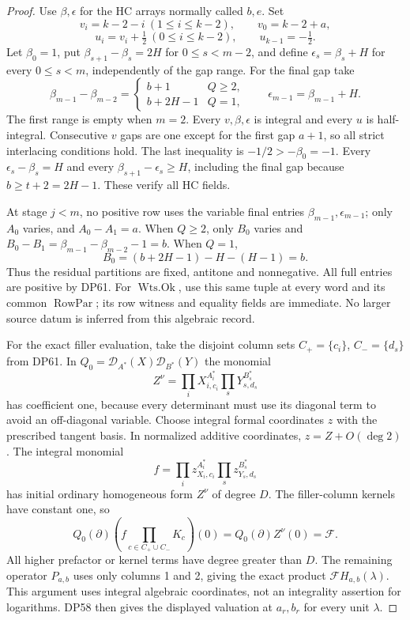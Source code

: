 \begin{proof}
Use $\beta,\epsilon$ for the HC arrays normally called $b,e$.
Set
\[
 v_i=k-2-i\ (1\le i\le k-2),\qquad v_0=k-2+a,
\]
\[
 u_i=v_i+\tfrac12\ (0\le i\le k-2),\qquad u_{k-1}=-\tfrac12.
\]
Let $\beta_0=1$, put $\beta_{s+1}-\beta_s=2H$ for $0\le s<m-2$,
and define $\epsilon_s=\beta_s+H$ for every $0\le s<m$, independently
of the gap range. For the final gap take
\[
 \beta_{m-1}-\beta_{m-2}=
 \begin{cases}b+1&Q\ge2,\\b+2H-1&Q=1,\end{cases}
 \qquad\epsilon_{m-1}=\beta_{m-1}+H.
\]
The first range is empty when $m=2$. Every $v,\beta,\epsilon$ is
integral and every $u$ is half-integral. Consecutive $v$ gaps are one
except for the first gap $a+1$, so all strict interlacing conditions
hold. The last inequality is $-1/2>-\beta_0=-1$.
Every $\epsilon_s-\beta_s=H$ and every
$\beta_{s+1}-\epsilon_s\ge H$, including the final gap because
$b\ge t+2=2H-1$. These verify all HC fields.

At stage $j<m$, no positive row uses the variable final entries
$\beta_{m-1},\epsilon_{m-1}$; only $A_0$ varies, and
$A_0-A_1=a$. When $Q\ge2$, only $B_0$ varies and
$B_0-B_1=\beta_{m-1}-\beta_{m-2}-1=b$.
When $Q=1$,
\[
 B_0=(b+2H-1)-H-(H-1)=b.
\]
Thus the residual partitions are fixed, antitone and nonnegative.
All full entries are positive by DP61. For $\operatorname{Wts.Ok}$,
use this same tuple at every word and its common $\operatorname{RowPar}$;
its row witness and equality fields are immediate. No larger source
datum is inferred from this algebraic record.

For the exact filler evaluation, take the disjoint column sets
$C_+=\{c_i\}$, $C_-=\{d_s\}$ from DP61. In
$Q_0=\mathcal D_{A^*}(X)\mathcal D_{B^*}(Y)$ the monomial
\[
 Z^\nu=\prod_iX_{i,c_i}^{A_i^*}\prod_sY_{s,d_s}^{B_s^*}
\]
has coefficient one, because every determinant must use its diagonal
term to avoid an off-diagonal variable. Choose integral formal
coordinates $z$ with the prescribed tangent basis. In normalized
additive coordinates, $z=Z+O(\deg2)$. The integral monomial
\[
 f=\prod_i z_{X_i,c_i}^{A_i^*}\prod_s z_{Y_s,d_s}^{B_s^*}
\]
has initial ordinary homogeneous form $Z^\nu$ of degree $D$.
The filler-column kernels have constant one, so
\[
 Q_0(\partial)\left(f\prod_{c\in C_+\cup C_-}K_c\right)(0)
 =Q_0(\partial)Z^\nu(0)=\mathcal F.
\]
All higher prefactor or kernel terms have degree greater than $D$.
The remaining operator $P_{a,b}$ uses only columns 1 and 2, giving the
exact product $\mathcal F H_{a,b}(\lambda)$. This argument uses integral
algebraic coordinates, not an integrality assertion for logarithms.
DP58 then gives the displayed valuation at $a_r,b_r$ for every unit
$\lambda$.


\end{proof}
